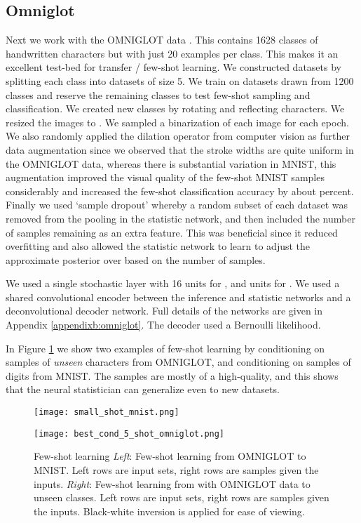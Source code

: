 \documentclass{article} \usepackage{iclr2017_conference,times}
\begin{document}
\subsection{Omniglot}
Next we work with the OMNIGLOT data \citep{omniglot}. This contains 1628 classes of handwritten characters but with just 20 examples per class. This makes it an excellent test-bed for transfer / few-shot learning. We constructed datasets by splitting each class into datasets of size 5. We train on datasets drawn from 1200 classes and reserve the remaining classes to test few-shot sampling and classification. We created new classes by rotating and reflecting characters. We resized the images to . We sampled a binarization of each image for each epoch. We also randomly applied the dilation operator from computer vision as further data augmentation since we observed that the stroke widths are quite uniform in the OMNIGLOT data, whereas there is substantial variation in MNIST, this augmentation improved the visual quality of the few-shot MNIST samples considerably and increased the few-shot classification accuracy by about  percent. Finally we used `sample dropout' whereby a random subset of each dataset was removed from the pooling in the statistic network, and then included the number of samples remaining  as an extra feature. This was beneficial since it reduced overfitting and also allowed the statistic network to learn to adjust the approximate posterior over  based on the number of samples.

We used a single stochastic layer with 16 units for , and  units for . We used a shared convolutional encoder between the inference and statistic networks and a deconvolutional decoder network. Full details of the networks are given in Appendix \ref{appendixb:omniglot}. The decoder used a Bernoulli likelihood. 

In Figure \ref{fig:small_shot} we show two examples of few-shot learning by conditioning on samples of \emph{unseen} characters from OMNIGLOT, and conditioning on samples of digits from MNIST. The  samples are mostly of a high-quality, and this shows that the neural statistician can generalize even to new datasets. 

\begin{figure}
\begin{minipage}{0.5\textwidth}
\centering
\texttt{[image: small\_shot\_mnist.png]}
\end{minipage}
\begin{minipage}{0.5\textwidth}
\centering
\texttt{[image: best\_cond\_5\_shot\_omniglot.png]}
\end{minipage}
\caption{Few-shot learning \emph{Left}: Few-shot learning from OMNIGLOT to MNIST. Left rows are input sets, right rows are samples given the inputs. \emph{Right}: Few-shot learning from with OMNIGLOT data to unseen classes. Left rows are input sets, right rows are samples given the inputs. Black-white inversion is applied for ease of viewing. \label{fig:small_shot}}
\vspace{-1em}
\end{figure}
\end{document}
